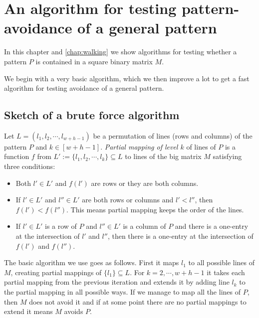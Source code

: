 \chapter{An algorithm for testing pattern-avoidance of a general pattern}
\label{chap:general}
In this chapter and \autoref{chap:walking} we show algorithms for testing whether a pattern $P$ is contained in a square binary matrix $M$.

We begin with a very basic algorithm, which we then improve a lot to get a fast algorithm for testing avoidance of a general pattern.

\section{Sketch of a brute force algorithm}
Let $L=(l_1,l_2,\cdots,l_{w+h-1})$ be a permutation of lines (rows and columns) of the pattern $P$ and $k\in[w+h-1]$. \emph{Partial mapping of level $k$} of lines of $P$ is a function $f$ from $L':=\{l_1,l_2,\cdots,l_k\}\subseteq L$ to lines of the big matrix $M$ satisfying three conditions: 
\begin{itemize}
\item Both $l'\in L'$ and $f(l')$ are rows or they are both columns.
\item If $l'\in L'$ and $l''\in L'$ are both rows or columns and $l'<l''$, then $f(l')<f(l'')$. This means partial mapping keeps the order of the lines.
\item If $l'\in L'$ is a row of $P$ and $l''\in L'$ is a column of $P$ and there is a one-entry at the intersection of $l'$ and $l''$, then there is a one-entry at the intersection of $f(l')$ and $f(l'')$.
\end{itemize}
The basic algorithm we use goes as follows. First it maps $l_1$ to all possible lines of $M$, creating partial mappings of $\{l_1\}\subseteq L$. For $k=2,\cdots,w+h-1$ it takes each partial mapping from the previous iteration and extends it by adding line $l_k$ to the partial mapping in all possible ways. If we manage to map all the lines of $P$, then $M$ does not avoid it and if at some point there are no partial mappings to extend it means $M$ avoids $P$.

